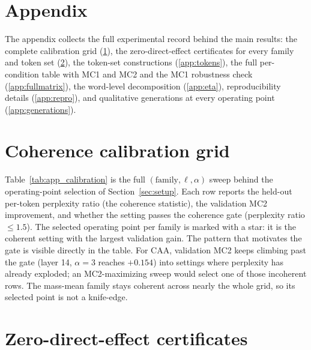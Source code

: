 \appendix
\section*{Appendix}

The appendix collects the full experimental record behind the main results: the complete calibration grid (\ref{app:calibration}), the zero-direct-effect certificates for every family and token set (\ref{app:certificates}), the token-set constructions (\ref{app:tokens}), the full per-condition table with MC1 and MC2 and the MC1 robustness check (\ref{app:fullmatrix}), the word-level decomposition (\ref{app:eta}), reproducibility details (\ref{app:repro}), and qualitative generations at every operating point (\ref{app:generations}).

\section{Coherence calibration grid}\label{app:calibration}

Table~\ref{tab:app_calibration} is the full $(\text{family}, \ell, \alpha)$ sweep behind the operating-point selection of Section~\ref{sec:setup}. Each row reports the held-out per-token perplexity ratio (the coherence statistic), the validation MC2 improvement, and whether the setting passes the coherence gate (perplexity ratio $\le 1.5$). The selected operating point per family is marked with a star: it is the coherent setting with the largest validation gain. The pattern that motivates the gate is visible directly in the table. For CAA, validation MC2 keeps climbing past the gate (layer 14, $\alpha{=}3$ reaches $+0.154$) into settings where perplexity has already exploded; an MC2-maximizing sweep would select one of those incoherent rows. The mass-mean family stays coherent across nearly the whole grid, so its selected point is not a knife-edge.

\begin{table}[h]
\centering
\small

\caption{Full coherence-calibration grid. $^{\star}$ marks the selected operating point. ``coherent?'' is the gate verdict (perplexity ratio $\le 1.5$). Figure~\ref{fig:calibration} plots these values.}
\label{tab:app_calibration}
\end{table}

\section{Zero-direct-effect certificates}\label{app:certificates}

